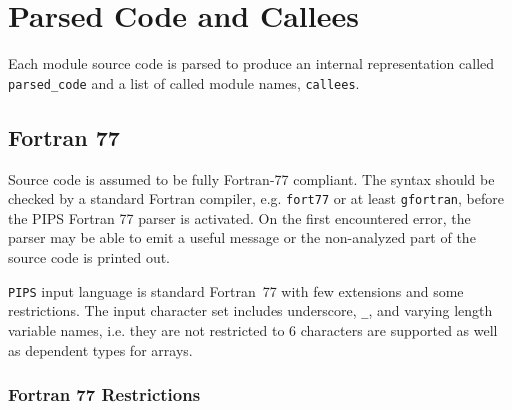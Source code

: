 \documentclass[a4paper]{report}
\newcommand{\Pips}{\texttt{PIPS}}
\begin{document}
\section{Parsed Code and Callees}
\label{subsection-parsed-code-and-callees}

Each module source code is parsed to produce an internal representation
called \verb+parsed_code+ and a list of called module names,
\verb+callees+.


\subsection{Fortran 77}
\label{sec:fortran}


Source code is assumed to be fully Fortran-77 compliant. The syntax
should be checked by a standard Fortran compiler, e.g. \verb/fort77/
or at least \verb/gfortran/, before the PIPS Fortran 77 parser is
activated. On the first encountered error, the parser may be able to
emit a useful message or the non-analyzed part of the source code is
printed out.

\Pips{} input language is standard Fortran~77 with few extensions and some
restrictions. The input character set includes underscore, \verb/_/, and
varying length variable names, i.e. they are not restricted to 6
characters are supported as well as dependent types for arrays.

\subsubsection{Fortran 77 Restrictions}
\end{document}
